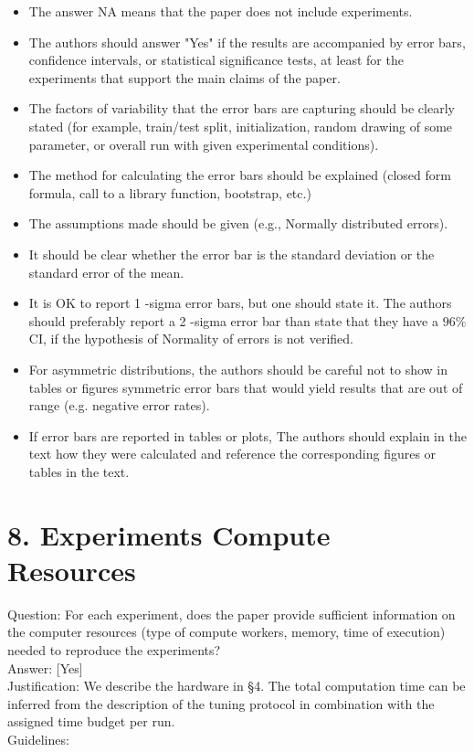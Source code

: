 \documentclass[10pt]{article}
\begin{document}
\begin{itemize}
  \item The answer NA means that the paper does not include experiments.
  \item The authors should answer "Yes" if the results are accompanied by error bars, confidence intervals, or statistical significance tests, at least for the experiments that support the main claims of the paper.
  \item The factors of variability that the error bars are capturing should be clearly stated (for example, train/test split, initialization, random drawing of some parameter, or overall run with given experimental conditions).
  \item The method for calculating the error bars should be explained (closed form formula, call to a library function, bootstrap, etc.)
  \item The assumptions made should be given (e.g., Normally distributed errors).
  \item It should be clear whether the error bar is the standard deviation or the standard error of the mean.
  \item It is OK to report 1 -sigma error bars, but one should state it. The authors should preferably report a 2 -sigma error bar than state that they have a $96 \%$ CI, if the hypothesis of Normality of errors is not verified.
  \item For asymmetric distributions, the authors should be careful not to show in tables or figures symmetric error bars that would yield results that are out of range (e.g. negative error rates).
  \item If error bars are reported in tables or plots, The authors should explain in the text how they were calculated and reference the corresponding figures or tables in the text.
\end{itemize}

\section*{8. Experiments Compute Resources}
Question: For each experiment, does the paper provide sufficient information on the computer resources (type of compute workers, memory, time of execution) needed to reproduce the experiments?\\[0pt]
Answer: [Yes]\\
Justification: We describe the hardware in §4. The total computation time can be inferred from the description of the tuning protocol in combination with the assigned time budget per run.\\
Guidelines:
\end{document}
